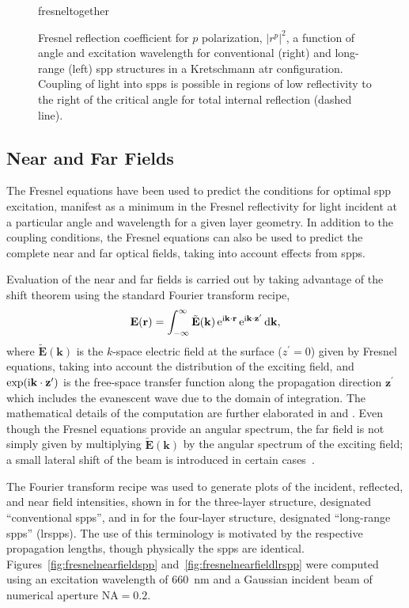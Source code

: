 \begin{figure}[ht]
  \centering
  {fresneltogether}
  \caption{Fresnel reflection coefficient for $p$ polarization, $|r^p|^2$, a
    function of angle and excitation wavelength for conventional (right) and
    long-range (left) \gls{spp} structures in a Kretschmann \gls{atr} configuration.
    Coupling of light into \glspl{spp} is possible in regions of low reflectivity to the right of the
    critical angle for total internal reflection (dashed line).}
  \label{fig:fresnelangle}
\end{figure}

\subsection{Near and Far Fields}\label{sec:fresnelnearfar}
The Fresnel equations have been used to predict the conditions for
optimal \gls{spp} excitation, manifest as a minimum in the Fresnel reflectivity
for light incident at a particular angle and wavelength for a given layer
geometry.  In addition to the coupling conditions, the Fresnel equations
can also be used to predict the complete near and far optical fields,
taking into account effects from \glspl{spp}.

Evaluation of the near and far fields is carried out by taking advantage of
the shift theorem using the standard Fourier transform recipe,
\begin{equation}
  \mathbf{E}(\mathbf{r}) = \int_{-\infty}^{\infty} \tilde{\mathbf{E}}(\mathbf{k})
  \,{\mathrm{e}}^{{\mathrm{i}} \mathbf{k} \cdot \mathbf{r}}
  \,{\mathrm{e}}^{{\mathrm{i}} \mathbf{k} \cdot \mathbf{z}^\prime} \,\mathrm{d} \mathbf{k},
\end{equation}
where $\tilde{\mathbf{E}}(\mathbf{k})$ is the $k$-space electric field at
the surface ($z^\prime=0$) given by Fresnel equations, taking into account
the distribution of the exciting field, and $\exp({\mathrm{i}} \mathbf{k} \cdot
  \mathbf{z}^\prime)$ is the free-space transfer function along the
propagation direction $\mathbf{z}^\prime$ which includes the evanescent
wave due to the domain of integration.  The mathematical details of the
computation are further elaborated in  and
.  Even though the Fresnel equations provide
an angular spectrum, the far field is not simply given by multiplying
$\tilde{\mathbf{E}}(\mathbf{k})$ by the angular spectrum of the exciting
field; a small lateral shift of the beam is introduced in certain
cases~\cite{chuang1986lateral}.

The Fourier transform recipe was used to generate plots of the incident,
reflected, and near field intensities, shown in
 for the three-layer structure, designated
``conventional \glspl{spp}'', and in  for the
four-layer structure, designated ``long-range \glspl{spp}'' (\glspl{lrspp}).  The use of
this terminology is motivated by the respective propagation lengths,
though physically the \glspl{spp} are identical.
Figures~\ref{fig:fresnelnearfieldspp} and~\ref{fig:fresnelnearfieldlrspp}
were computed using an excitation wavelength of \SI{660}{\nano\meter}
and a Gaussian incident beam of numerical aperture $\mathrm{NA}=0.2$.

